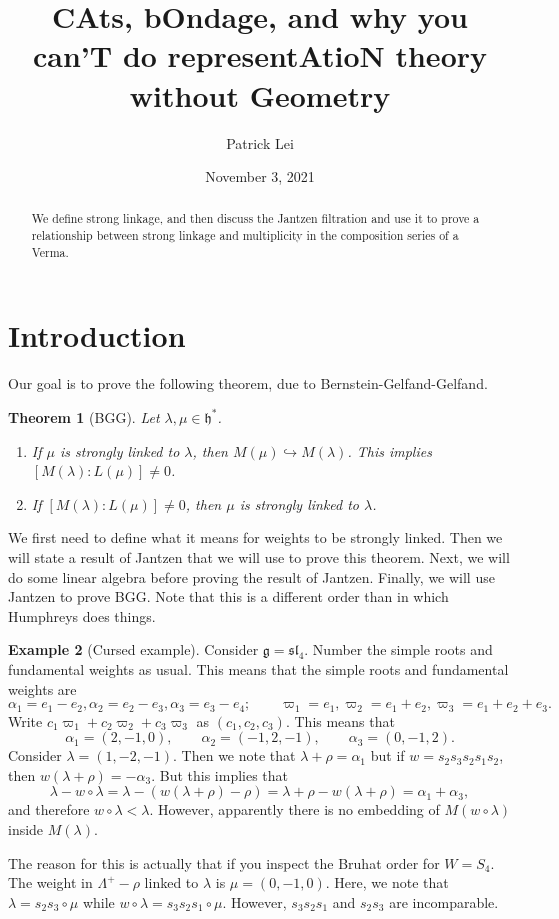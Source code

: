 \documentclass{amsart}
\title{CAts, bOndage, and why you can'T do representAtioN theory without Geometry}
\author{Patrick Lei}
\date{November 3, 2021}
\newtheorem{thm}{Theorem}[section]
\theoremstyle{definition}
\newtheorem{exm}[thm]{Example}
\theoremstyle{remark}
\theoremstyle{plain}
\theoremstyle{definition}
\theoremstyle{remark}
\newcommand{\g}{\mathfrak{g}}
\newcommand{\h}{\mathfrak{h}}
\newcommand{\mf}[1]{\mathfrak{#1}}
\newcommand{\1}{\mathbf{1}}
\newcommand{\2}{\mathbf{2}}
\newcommand{\3}{\mathbf{3}}
\begin{document}
    
\maketitle

\begin{abstract}
    We define strong linkage, and then discuss the Jantzen filtration and use it to prove a relationship between strong linkage and multiplicity in the composition series of a Verma.
\end{abstract}

\section{Introduction}
\label{sec:introduction}

Our goal is to prove the following theorem, due to Bernstein-Gelfand-Gelfand.
\begin{thm}[BGG]
  Let $\lambda, \mu \in \h^{*}$.
  \begin{enumerate}
    \item If $\mu$ is strongly linked to $\lambda$, then $M(\mu) \hookrightarrow M(\lambda)$. This implies $[M(\lambda) : L(\mu) ] \neq 0$.
    \item If $[M(\lambda) : L(\mu)] \neq 0$, then $\mu$ is strongly linked to $\lambda$.
  \end{enumerate}
\end{thm}

We first need to define what it means for weights to be strongly linked. Then we will state a result of Jantzen that we will use to prove this theorem. Next, we will do some linear algebra before proving the result of Jantzen. Finally, we will use Jantzen to prove BGG. Note that this is a different order than in which Humphreys does things.

\begin{exm}[Cursed example]
  Consider $\g = \mf{sl}_4$. Number the simple roots and fundamental weights as usual. This means that the simple roots and fundamental weights are
  \[ \alpha_1 = e_1 - e_2, \alpha_2 = e_2 - e_3, \alpha_3 = e_3 - e_4; \qquad \varpi_1 = e_1, \varpi_2 = e_1 + e_2, \varpi_3 = e_1 + e_2 + e_3. \]
  Write $c_1 \varpi_1 + c_2 \varpi_2 + c_3 \varpi_3$ as $(c_1, c_2, c_3)$. This means that
  \[\alpha_1 = (2,-1,0), \qquad \alpha_2 = (-1,2,-1), \qquad \alpha_3 = (0, -1, 2). \]
  Consider $\lambda = (1, -2, -1)$. Then we note that $\lambda + \rho = \alpha_1$ but if $w = s_2 s_3 s_2 s_1 s_2$, then $w(\lambda + \rho) = - \alpha_3$. But this implies that
  \[ \lambda - w \circ \lambda = \lambda - (w(\lambda + \rho) - \rho) = \lambda + \rho - w(\lambda + \rho) = \alpha_1 + \alpha_3, \]
  and therefore $w \circ \lambda < \lambda$. However, apparently there is no embedding of $M(w \circ \lambda)$ inside $M(\lambda)$.

  The reason for this is actually that if you inspect the Bruhat order for $W = S_4$. The weight in $\Lambda^+ - \rho$ linked to $\lambda$ is $\mu = (0, -1, 0)$. Here, we note that $\lambda = s_2 s_3 \circ \mu$ while $w \circ \lambda = s_3 s_2 s_1 \circ \mu$. However, $s_3 s_2 s_1$ and $s_2 s_3$ are incomparable.
\end{exm}
\end{document}
